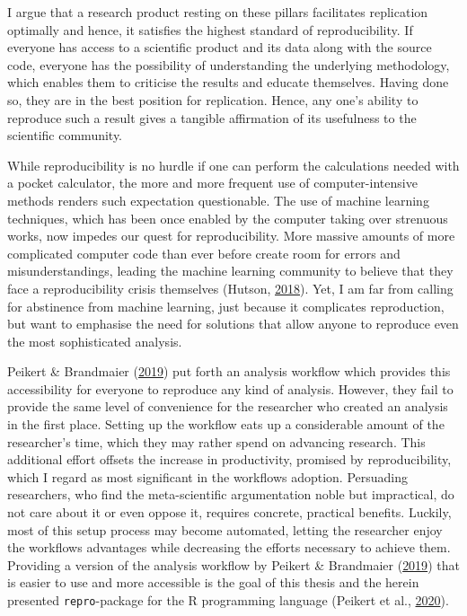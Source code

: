 \documentclass[12pt,a4paper,]{article}
\begin{document}
I argue that a research product resting on these pillars facilitates replication optimally and hence, it satisfies the highest standard of reproducibility.
If everyone has access to a scientific product and its data along with the source code, everyone has the possibility of understanding the underlying methodology, which enables them to criticise the results and educate themselves.
Having done so, they are in the best position for replication.
Hence, any one's ability to reproduce such a result gives a tangible affirmation of its usefulness to the scientific community.

While reproducibility is no hurdle if one can perform the calculations needed with a pocket calculator, the more and more frequent use of computer-intensive methods renders such expectation questionable.
The use of machine learning techniques, which has been once enabled by the computer taking over strenuous works, now impedes our quest for reproducibility.
More massive amounts of more complicated computer code than ever before create room for errors and misunderstandings, leading the machine learning community to believe that they face a reproducibility crisis themselves (Hutson, \protect\hyperlink{ref-hutsonArtificialIntelligenceFaces2018}{2018}).
Yet, I am far from calling for abstinence from machine learning, just because it complicates reproduction, but want to emphasise the need for solutions that allow anyone to reproduce even the most sophisticated analysis.

Peikert \& Brandmaier (\protect\hyperlink{ref-peikertReproducibleDataAnalysis2019}{2019}) put forth an analysis workflow which provides this accessibility for everyone to reproduce any kind of analysis.
However, they fail to provide the same level of convenience for the researcher who created an analysis in the first place.
Setting up the workflow eats up a considerable amount of the researcher's time, which they may rather spend on advancing research.
This additional effort offsets the increase in productivity, promised by reproducibility, which I regard as most significant in the workflows adoption.
Persuading researchers, who find the meta-scientific argumentation noble but impractical, do not care about it or even oppose it, requires concrete, practical benefits.
Luckily, most of this setup process may become automated, letting the researcher enjoy the workflows advantages while decreasing the efforts necessary to achieve them.
Providing a version of the analysis workflow by Peikert \& Brandmaier (\protect\hyperlink{ref-peikertReproducibleDataAnalysis2019}{2019}) that is easier to use and more accessible is the goal of this thesis and the herein presented \texttt{repro}-package for the R programming language (Peikert et al., \protect\hyperlink{ref-R-repro}{2020}).
\end{document}
